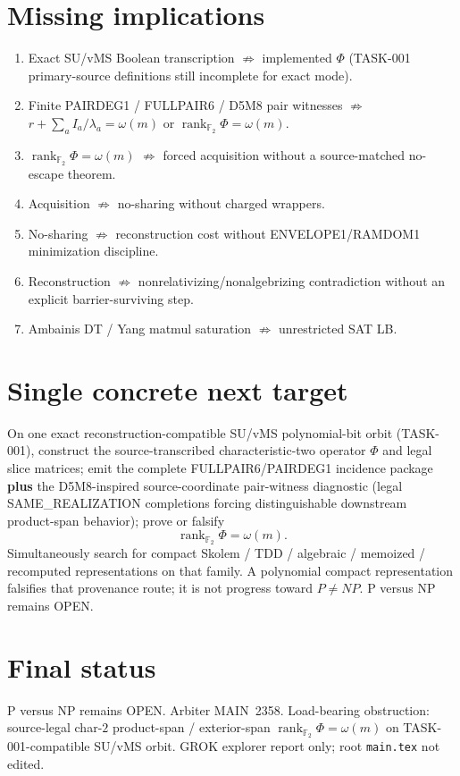 \documentclass[11pt]{article}
\begin{document}
\section*{Missing implications}
\begin{enumerate}
\item Exact SU/vMS Boolean transcription $\not\Rightarrow$ implemented $\Phi$
(TASK-001 primary-source definitions still incomplete for exact mode).
\item Finite PAIRDEG1 / FULLPAIR6 / D5M8 pair witnesses $\not\Rightarrow$
$r+\sum_a I_a/\lambda_a=\omega(m)$ or $\operatorname{rank}_{\mathbb F_2}\Phi=\omega(m)$.
\item $\operatorname{rank}_{\mathbb F_2}\Phi=\omega(m)$ $\not\Rightarrow$ forced
acquisition without a source-matched no-escape theorem.
\item Acquisition $\not\Rightarrow$ no-sharing without charged wrappers.
\item No-sharing $\not\Rightarrow$ reconstruction cost without ENVELOPE1/RAMDOM1
minimization discipline.
\item Reconstruction $\not\Rightarrow$ nonrelativizing/nonalgebrizing contradiction
without an explicit barrier-surviving step.
\item Ambainis DT / Yang matmul saturation $\not\Rightarrow$ unrestricted SAT LB.
\end{enumerate}

\section*{Single concrete next target}
On one exact reconstruction-compatible SU/vMS polynomial-bit orbit (TASK-001),
construct the source-transcribed characteristic-two operator $\Phi$ and legal
slice matrices; emit the complete FULLPAIR6/PAIRDEG1 incidence package
\textbf{plus} the D5M8-inspired source-coordinate pair-witness diagnostic
(legal SAME\_REALIZATION completions forcing distinguishable downstream
product-span behavior); prove or falsify
\[
\boxed{\operatorname{rank}_{\mathbb F_2}\Phi=\omega(m)}.
\]
Simultaneously search for compact Skolem / TDD / algebraic / memoized /
recomputed representations on that family. A polynomial compact representation
falsifies that provenance route; it is not progress toward $P\neq NP$.
P versus NP remains OPEN.

\section*{Final status}
P versus NP remains OPEN. Arbiter MAIN~2358. Load-bearing obstruction:
source-legal char-$2$ product-span / exterior-span
$\operatorname{rank}_{\mathbb F_2}\Phi=\omega(m)$ on TASK-001-compatible SU/vMS
orbit. GROK explorer report only; root \texttt{main.tex} not edited.

\end{document}

